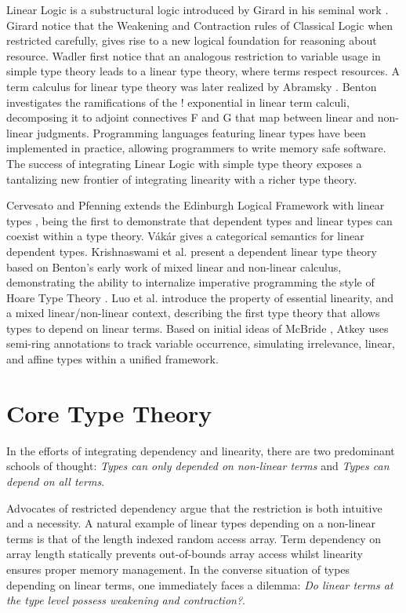 \documentclass{article}
\begin{document}
  Linear Logic is a substructural logic introduced by Girard in his seminal work \cite{girard}. Girard notice that the Weakening and Contraction rules of Classical Logic when restricted carefully, gives rise to a new logical foundation for reasoning about resource. Wadler \cite{wadler1990,wadler1991} first notice that an analogous restriction to variable usage in simple type theory leads to a linear type theory, where terms respect resources. A term calculus for linear type theory was later realized by Abramsky \cite{abramsky1993}. Benton \cite{benton1994} investigates the ramifications of the ! exponential in linear term calculi, decomposing it to adjoint connectives F and G that map between linear and non-linear judgments. Programming languages \cite{l3,ats,linear-haskell} featuring linear types have been implemented in practice, allowing programmers to write memory safe software. The success of integrating Linear Logic with simple type theory exposes a tantalizing new frontier of integrating linearity with a richer type theory.

  Cervesato and Pfenning extends the Edinburgh Logical Framework with linear types \cite{lf,llf}, being the first to demonstrate that dependent types and linear types can coexist within a type theory. V\'{a}k\'{a}r gives a categorical semantics for linear dependent types.  Krishnaswami et al. present a dependent linear type theory \cite{neel15} based on Benton's early work of mixed linear and non-linear calculus, demonstrating the ability to internalize imperative programming the style of Hoare Type Theory \cite{htt}. Luo et al. introduce the property of essential linearity, and a mixed linear/non-linear context, describing the first type theory that allows types to depend on linear terms. Based on initial ideas of McBride \cite{nothing}, Atkey \cite{qtt} uses semi-ring annotations to track variable occurrence, simulating irrelevance, linear, and affine types within a unified framework.

  
  \section{Core Type Theory}
  In the efforts of integrating dependency and linearity, there are two predominant schools of thought: \textit{Types can only depended on non-linear terms} and \textit{Types can depend on all terms}. 
  
  Advocates of restricted dependency argue that the restriction is both intuitive and a necessity. A natural example of linear types depending on a non-linear terms is that of the length indexed random access array. Term dependency on array length statically prevents out-of-bounds array access whilst linearity ensures proper memory management. In the converse situation of types depending on linear terms, one immediately faces a dilemma: \textit{Do linear terms at the type level possess weakening and contraction?}.
  
\end{document}
